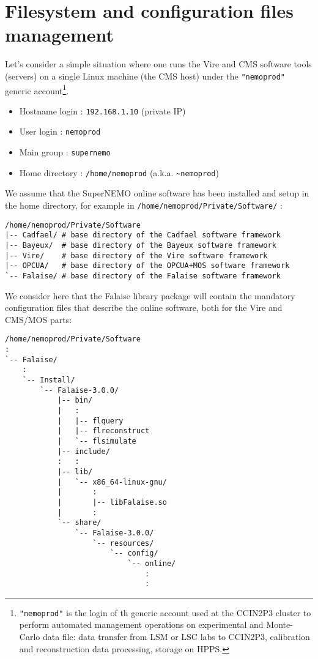 
\section{Filesystem and configuration files management}\label{app:filesystem_conf}

Let's consider  a simple  situation where  one runs  the Vire  and CMS
software  tools (servers)  on a  single Linux  machine (the  CMS host)
under            the            \texttt{"nemoprod"}            generic
account\footnote{\texttt{"nemoprod"}  is  the   login  of  th  generic
  account used at the CCIN2P3  cluster to perform automated management
  operations on experimental and  Monte-Carlo data file: data transfer
  from LSM or LSC labs to CCIN2P3, calibration and reconstruction data
  processing, storage on HPPS.}.

\begin{itemize}
\item Hostname login : \verb|192.168.1.10| (private IP) %
\item User login : \texttt{nemoprod}
\item Main group : \texttt{supernemo}
\item Home directory : \verb|/home/nemoprod| (a.k.a. \verb|~nemoprod|)
\end{itemize}

\noindent  We  assume that  the  SuperNEMO  online software  has  been
installed   and  setup   in  the   home  directory,   for  example in
\verb|/home/nemoprod/Private/Software/| :
\vskip 20pt
\small
\begin{Verbatim}[frame=single,xleftmargin=0.cm,label=\fbox{Filesystem}]
/home/nemoprod/Private/Software
|-- Cadfael/ # base directory of the Cadfael software framework
|-- Bayeux/  # base directory of the Bayeux software framework
|-- Vire/    # base directory of the Vire software framework
|-- OPCUA/   # base directory of the OPCUA+MOS software framework
`-- Falaise/ # base directory of the Falaise software framework
\end{Verbatim}
\normalsize

\noindent  We consider  here  that the  Falaise  library package  will
contain  the mandatory  configuration files  that describe  the online
software, both for the Vire and CMS/MOS parts:
\vskip 20pt
\small
\begin{Verbatim}[frame=single,xleftmargin=0.cm,label=\fbox{Filesystem}]
/home/nemoprod/Private/Software
:
`-- Falaise/
    :
    `-- Install/
        `-- Falaise-3.0.0/
            |-- bin/
            |   :
            |   |-- flquery
            |   |-- flreconstruct
            |   `-- flsimulate
            |-- include/
            :   :
            |-- lib/
            |   `-- x86_64-linux-gnu/
            |       :
            |       |-- libFalaise.so
            |       :
            `-- share/
                `-- Falaise-3.0.0/
                    `-- resources/
                        `-- config/
                            `-- online/
                                :
                                :
\end{Verbatim}
\normalsize

